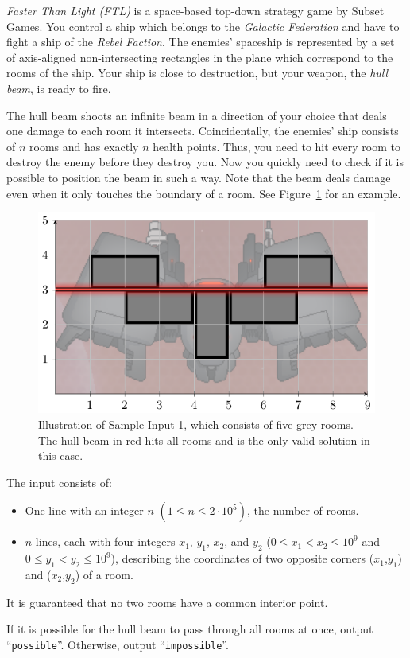 \emph{Faster Than Light (FTL)} is a space-based top-down strategy game by Subset Games.
You control a ship which belongs to the \emph{Galactic Federation} and have to fight a ship of the \emph{Rebel Faction}.
The enemies' spaceship is represented by a set of axis-aligned non-intersecting rectangles in the plane which correspond to the rooms of the ship.
Your ship is close to destruction, but your weapon, the \emph{hull beam}, is ready to fire.

The hull beam shoots an infinite beam in a direction of your choice that deals one damage to each room it intersects.
Coincidentally, the enemies' ship consists of $n$ rooms and has exactly $n$ health points.
Thus, you need to hit every room to destroy the enemy before they destroy you.
Now you quickly need to check if it is possible to position the beam in such a way.
Note that the beam deals damage even when it only touches the boundary of a room.
See Figure~\ref{fig:f} for an example.

\begin{figure}[h]
	\centering
	\includegraphics{sample}
	\caption{Illustration of Sample Input 1, which consists of five grey
	rooms. The hull beam in red hits all rooms and is the only valid
	solution in this case.}
    \label{fig:f}
\end{figure}

\begin{Input}
	The input consists of:
	\begin{itemize}
		\item One line with an integer $n$ $(1\leq n \leq 2\cdot10^5)$, the number of rooms.
		\item $n$ lines, each with four integers $x_1$, $y_1$, $x_2$, and $y_2$ (${0\leq x_1<x_2\leq10^9}$ and ${0\leq y_1<y_2\leq10^9}$), describing the coordinates of two opposite corners ($x_1$,$y_1$) and ($x_2$,$y_2$) of a room.
	\end{itemize}
	It is guaranteed that no two rooms have a common interior point.
\end{Input}
\begin{Output}
	If it is possible for the hull beam to pass through all rooms at once, output ``\texttt{possible}''.
	Otherwise, output ``\texttt{impossible}''.
\end{Output}
